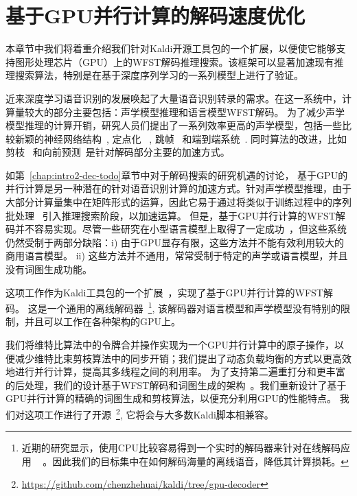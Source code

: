 
\chapter{基于GPU并行计算的解码速度优化}
\label{chap:gpu}

本章节中我们将着重介绍我们针对Kaldi开源工具包的一个扩展，以便使它能够支持图形处理芯片（GPU）上的WFST解码推理搜索。该框架可以显著加速现有推理搜索算法，特别是在基于深度序列学习的一系列模型上进行了验证。

近来深度学习语音识别的发展唤起了大量语音识别转录的需求。在这一系统中，计算量较大的部分主要包括：声学模型推理和语言模型WFST解码。
%
为了减少声学模型推理的计算开销，研究人员们提出了一系列效率更高的声学模型，包括一些比较新颖的神经网络结构~\cite{xue2014singular,peddinti2018low}, 定点化
~\cite{mcgraw2016personalized}, 跳帧~\cite{pundak2016lower,zhc00-chen-is16,zhc00-chen-tasl2017}
和端到端系统~\cite{audhkhasi2017direct,e2e-2018}.
同时算法的改进，比如剪枝~\cite{mohri2002weighted,hori2004fast}
和向前预测~\cite{soltau2009dynamic,nolden2012search}是针对解码部分主要的加速方式。

如第~\ref{chap:intro2-dec-todo}章节中对于解码搜索的研究机遇的讨论，
基于GPU的并行计算是另一种潜在的针对语音识别计算的加速方式。针对声学模型推理，由于大部分计算量集中在矩阵形式的运算，因此它易于通过将类似于训练过程中\cite{vesely2010parallel}的序列批处理~\cite{dixon2009harnessing} 引入推理搜索阶段，以加速运算。
但是，基于GPU并行计算的WFST解码并不容易实现。尽管一些研究在小型语言模型上取得了一定成功~\cite{you2009parallel}，但这些系统仍然受制于两部分缺陷：i) 由于GPU显存有限，这些方法并不能有效利用较大的商用语言模型。
ii) 这些方法并不通用，常常受制于特定的声学或语言模型，并且没有词图生成功能。



这项工作作为Kaldi工具包的一个扩展~\cite{povey2011kaldi}，实现了基于GPU并行计算的WFST解码。
%
这是一个通用的离线解码器~\footnote{近期的研究显示，使用CPU比较容易得到一个实时的解码器来针对在线解码应用
 ~\cite{peddinti2018low,zhc00-chen-tasl2017} 。因此我们的目标集中在如何解码海量的离线语音，降低其计算损耗。},
 该解码器对语言模型和声学模型没有特别的限制，并且可以工作在各种架构的GPU上。
%

我们将维特比算法中的令牌合并操作实现为一个GPU并行计算中的原子操作，以便减少维特比束剪枝算法中的同步开销；我们提出了动态负载均衡的方式以更高效地进行并行计算，提高其多线程之间的利用率。
为了支持第二遍重打分和更丰富的后处理，我们的设计基于WFST解码和词图生成的架构~\cite{povey2012generating}。我们重新设计了基于GPU并行计算的精确的词图生成和剪枝算法，以便充分利用GPU的性能特点。
%
我们对这项工作进行了开源~\footnote{\url{https://github.com/chenzhehuai/kaldi/tree/gpu-decoder}},
它将会与大多数Kaldi脚本相兼容。



